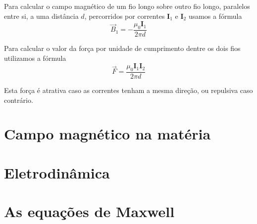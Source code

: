 \documentclass[11pt]{article}
\begin{document}
Para calcular o campo magnético de um fio longo sobre outro fio longo, paralelos entre si, a uma distância $d$, percorridos por correntes $\mathbf{I}_1$ e $\mathbf{I}_2$ usamos a fórmula
\[ \displaystyle \overrightarrow{B}_1 = -\frac{\mu_0\mathbf{I}_1}{2\pi d} \]

Para calcular o valor da força por unidade de cumprimento dentre os dois fios utilizamos a fórmula
\[ \displaystyle \overrightarrow{F} = \frac{\mu_0\mathbf{I}_1\mathbf{I}_2}{2\pi d} \]

Esta força é atrativa caso as correntes tenham a mesma direção, ou repulsiva caso contrário.

\section{Campo magnético na matéria}

\section{Eletrodinâmica}

\section{As equações de Maxwell}
\end{document}
